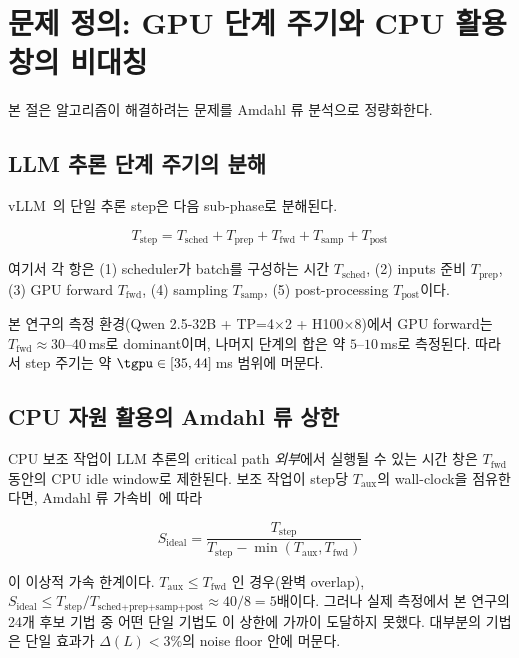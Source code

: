 
\section{문제 정의: GPU 단계 주기와 CPU 활용 창의 비대칭}
\label{sec:problem}

본 절은 \algname 알고리즘이 해결하려는 문제를 Amdahl 류 분석으로 정량화한다.

\subsection{LLM 추론 단계 주기의 분해}

vLLM~\cite{kwon2023vllm}의 단일 추론 step은 다음 sub-phase로 분해된다.

\begin{equation}
T_{\text{step}} = T_{\text{sched}} + T_{\text{prep}} + T_{\text{fwd}} + T_{\text{samp}} + T_{\text{post}}
\label{eq:step-decomp}
\end{equation}

여기서 각 항은 (1) scheduler가 batch를 구성하는 시간 $T_{\text{sched}}$, (2) inputs 준비 $T_{\text{prep}}$, (3) GPU forward $T_{\text{fwd}}$, (4) sampling $T_{\text{samp}}$, (5) post-processing $T_{\text{post}}$이다.

본 연구의 측정 환경(Qwen 2.5-32B + TP=4$\times$2 + H100$\times$8)에서 GPU forward는 $T_{\text{fwd}} \approx 30$--$40$\,ms로 dominant이며, 나머지 단계의 합은 약 $5$--$10$\,ms로 측정된다.
따라서 step 주기는 약 $\tgpu \in [35, 44]$\,ms 범위에 머문다.

\subsection{CPU 자원 활용의 Amdahl 류 상한}

CPU 보조 작업이 LLM 추론의 critical path \emph{외부}에서 실행될 수 있는 시간 창은 $T_{\text{fwd}}$ 동안의 CPU idle window로 제한된다.
보조 작업이 step당 $T_{\text{aux}}$의 wall-clock을 점유한다면, Amdahl 류 가속비~\cite{amdahl1967, hill2008amdahl}에 따라

\begin{equation}
S_{\text{ideal}} = \frac{T_{\text{step}}}{T_{\text{step}} - \min(T_{\text{aux}}, T_{\text{fwd}})}
\label{eq:amdahl-ideal}
\end{equation}

이 이상적 가속 한계이다.
$T_{\text{aux}} \leq T_{\text{fwd}}$ 인 경우(완벽 overlap), $S_{\text{ideal}} \leq T_{\text{step}} / T_{\text{sched+prep+samp+post}} \approx 40/8 = 5$배이다.
그러나 실제 측정에서 본 연구의 24개 후보 기법 중 어떤 단일 기법도 이 상한에 가까이 도달하지 못했다.
대부분의 기법은 단일 효과가 $\Delta(L) < 3\%$의 noise floor 안에 머문다.

